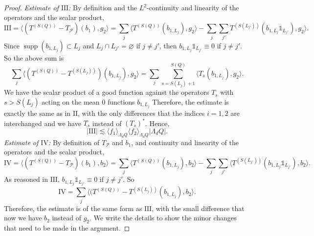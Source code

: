 \documentclass[12pt]{amsart}
\newcommand{\supp}[1]{\operatorname{supp}\left(#1\right) }
\newcommand{\one}{\mathds{1}}
\theoremstyle{plain}
\theoremstyle{definition} %
\numberwithin{equation}{section}
\begin{document}
\begin{proof}
\noindent \textit{Estimate of $\mathrm{III}$:} By definition and the $L^2$-continuity and linearity of the operators and the scalar product,
    \[
    \mathrm{III}
    =
    \langle (T^{(S(Q))}-T_{\mathcal{P}})(b_1),g_2\rangle
    =
    \sum_{j}\langle T^{(S(Q))}(b_{1,L_j}),g_2\rangle 
    -
    \sum_{j}\sum_{j'}T^{(S(L_{j'}))}(b_{1,L_j}\one_{L_{j'}}),g_2\rangle.
    \]
    Since $\supp{b_{1,L_j}}\subset L_j$ and $L_{j}\cap L_{j'}=\varnothing$ if $j\neq j'$, then $b_{1,L_j}\one_{L_{j'}}\equiv 0$ if $j\neq j'$. So the above sum is
    \[
    \sum_j \langle (T^{(S(Q))}-T^{(S(L_j))})(b_{1,L_j}),g_2\rangle 
    =
    \sum_j\sum_{s=S(L_j)+1}^{S(Q)}\langle T_s(b_{1,L_j}),g_2\rangle.
    \]
    We have the scalar product of a good function against the operators $T_s$ with $s>S(L_j)$ acting on the mean $0$ functions $b_{1,L_j}$ %
    Therefore, the estimate is exactly the same as in $\mathrm{II}$, with the only differences that the indices $i=1,2$ are interchanged and we have $T_s$ instead of $(T_s)^{\ast}$. Hence,
    \[
    |\mathrm{III}|
    \lesssim 
    \langle f_1\rangle_{\Lambda_d Q}
    \langle f_2\rangle_{\Lambda_d Q}
    |\Lambda_d Q|.
    \]
\noindent \textit{Estimate of $\mathrm{IV}$:} By definition of $T_{\mathcal{P}}$ and $b_1$, and continuity and linearity of the operators and the scalar product,
    \[
    \mathrm{IV}
    =
    \langle (T^{(S(Q))}-T_{\mathcal{P}})(b_1),b_2\rangle 
    =
    \sum_j \langle T^{(S(Q))}(b_{1,L_j}),b_2\rangle
    -
    \sum_j\sum_{j'}\langle T^{(S(L_{j'}))}(b_{1,L_j}\one_{L_{j'}}),b_2\rangle.
    \]
    As reasoned in $\mathrm{III}$, $b_{1,L_j}\one_{L_{j'}}\equiv 0$ if $j\neq j'$. So
    \[
    \mathrm{IV}
    =
    \sum_j \langle (T^{(S(Q))}-T^{(S(L_j))}(b_{1,L_j}),b_2\rangle.
    \]
    Therefore, the estimate is of the same form as $\mathrm{III}$, with the small difference that now we have $b_2$ instead of $g_2$. We write the details to show the minor changes that need to be made in the argument.
    

\end{proof}
\end{document}
